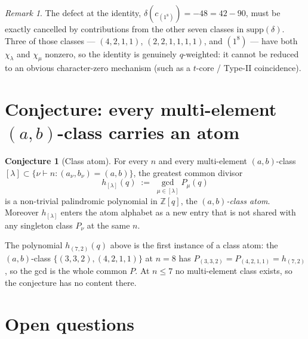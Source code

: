 \documentclass[11pt]{article}
\theoremstyle{definition}
\newtheorem{conjecture}[theorem]{Conjecture}
\theoremstyle{remark}
\newtheorem*{remark}{Remark}
\newcommand{\bbZ}{\mathbb{Z}}
\begin{document}
\begin{remark}
The defect at the identity, $\delta(c_{(1^{8})}) = -48 = 42 - 90$,
must be exactly cancelled by contributions from the other seven
classes in $\mathrm{supp}(\delta)$.  Three of those classes ---
$(4,2,1,1)$, $(2,2,1,1,1,1)$, and $(1^8)$ --- have both
$\chi_\lambda$ and $\chi_\mu$ nonzero, so the identity is genuinely
$q$-weighted: it cannot be reduced to an obvious character-zero
mechanism (such as a $t$-core / Type-II coincidence).
\end{remark}

\section{Conjecture: every multi-element $(a,b)$-class carries an atom}

\begin{conjecture}[Class atom]
For every $n$ and every multi-element $(a,b)$-class
$[\lambda] \subset \{\nu \vdash n : (a_\nu, b_\nu) = (a,b)\}$, the
greatest common divisor
\[
h_{[\lambda]}(q) \;:=\; \gcd_{\mu \in [\lambda]} P_\mu(q)
\]
is a non-trivial palindromic polynomial in $\bbZ[q]$, the
\emph{$(a,b)$-class atom}.  Moreover $h_{[\lambda]}$ enters the atom
alphabet as a new entry that is not shared with any singleton class
$P_\nu$ at the same $n$.
\end{conjecture}

The polynomial $h_{(7,2)}(q)$ above is the first instance of a class
atom: the $(a,b)$-class $\{(3,3,2), (4,2,1,1)\}$ at $n = 8$ has
$P_{(3,3,2)} = P_{(4,2,1,1)} = h_{(7,2)}$, so the gcd is the whole
common $P$.  At $n \le 7$ no multi-element class exists, so the
conjecture has no content there.

\section{Open questions}
\end{document}
